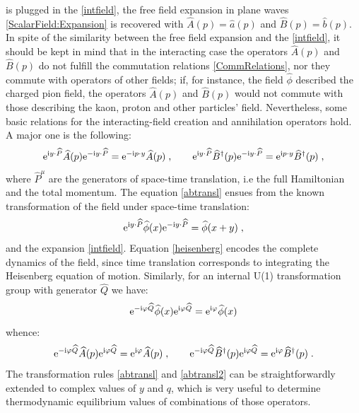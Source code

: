 \documentclass[prd,superscriptaddress,nofootinbib,notitlepage]{revtex4-1}
\def\wP{{\widehat P}}
\def\wA{{\widehat A}}
\def\wB{{\widehat B}}
\def\wQ{{\widehat Q}}
\def\wa{\widehat a}
\def\wb{\widehat b}
\def\wA{\widehat A}
\def\wB{\widehat B}
\def\wBd{\widehat B^{\dagger}}
\def\wQ{\widehat Q}
\def\wphi{\widehat \phi}
\newcommand{\e}{{\rm e}}
\newcommand{\ii}{{\rm i}}
\newcommand{\be}{\begin{equation}}
\newcommand{\ee}{\end{equation}}
\begin{document}
%
is plugged in the \eqref{intfield}, the free field expansion in plane waves \eqref{ScalarField:Expansion} is recovered with 
$\wA(p)=\wa(p)$ and $\wB(p)=\wb(p)$. In spite of the similarity between the free field expansion and the \eqref{intfield}, 
it should be kept in mind that in the interacting case the operators $\wA(p)$ and $\wB(p)$ do not fulfill the commutation relations \eqref{CommRelations}, nor they commute with operators of other fields; if, for instance, the field $\wphi$ described the charged 
pion field, the operators $\wA(p)$ and $\wB(p)$ would not commute with those describing the kaon, proton and other particles' field.
Nevertheless, some basic relations for the interacting-field creation and annihilation operators hold. A major one is the following:
%
\be\label{abtransl}
  \e^{\ii y \cdot \wP} \wA(p) \e^{-\ii y \cdot \wP} = \e^{-\ii p \cdot y} \wA(p)\;, \qquad
   \e^{\ii y \cdot \wP} \wBd(p) \e^{-\ii y \cdot \wP} = \e^{\ii p \cdot y} \wBd(p)\;,
\ee
%
where $\wP^\mu$ are the generators of space-time translation, i.e the full Hamiltonian and the total momentum. The equation
\eqref{abtransl} ensues from the known transformation of the field under space-time translation:
%
\be\label{heisenberg}
  \e^{\ii y \cdot \wP} \wphi(x) \e^{-\ii y \cdot \wP} =  \wphi(x+y) \;,
\ee
%
and the expansion \eqref{intfield}. Equation \eqref{heisenberg} encodes the complete dynamics of the field, since time translation 
corresponds to integrating the Heisenberg equation of motion. Similarly, for an internal U(1) transformation group with generator
$\wQ$ we have:
%
$$
 \e^{-\ii \varphi \wQ} \wphi(x) \e^{\ii \varphi \wQ} = \e^{\ii \varphi} \wphi(x) 
$$
%
whence:
%
\be\label{abtransl2}
\e^{- \ii \varphi \wQ} \wA(p) \e^{\ii \varphi \wQ} = \e^{\ii \varphi} \wA(p)\;, \qquad
  \e^{- \ii \varphi \wQ} \wBd(p) \e^{\ii \varphi \wQ} = \e^{\ii \varphi} \wBd(p)\;.
\ee
%
The transformation rules \eqref{abtransl} and \eqref{abtransl2} can be straightforwardly extended to complex values of $y$ and
$q$, which is very useful to determine thermodynamic equilibrium values of combinations of those operators.
\end{document}

